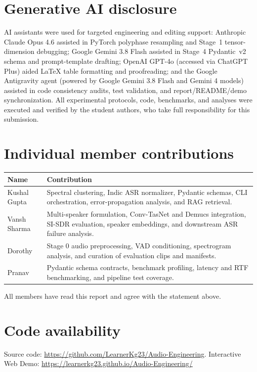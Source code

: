 \documentclass[11pt,a4paper,twocolumn]{article}
\newcommand{\githuburl}{https://github.com/LearnerKg23/Audio-Engineering}
\newcommand{\demourl}{https://learnerkg23.github.io/Audio-Engineering/}
\begin{document}
\section*{Generative AI disclosure}
AI assistants were used for targeted engineering and editing support: Anthropic Claude Opus 4.6 assisted in PyTorch polyphase resampling and Stage~1 tensor-dimension debugging; Google Gemini 3.8 Flash assisted in Stage~4 Pydantic~v2 schema and prompt-template drafting; OpenAI GPT-4o (accessed via ChatGPT Plus) aided LaTeX table formatting and proofreading; and the Google Antigravity agent (powered by Google Gemini 3.8 Flash and Gemini 4 models) assisted in code consistency audits, test validation, and report/README/demo synchronization. All experimental protocols, code, benchmarks, and analyses were executed and verified by the student authors, who take full responsibility for this submission.

\section*{Individual member contributions}
{\small
\begin{tabularx}{\linewidth}{@{}l X@{}}
\toprule
\textbf{Name} & \textbf{Contribution} \\
\midrule
Kushal Gupta & Spectral clustering, Indic ASR normalizer, Pydantic schemas, CLI orchestration, error-propagation analysis, and RAG retrieval. \\
Vansh Sharma & Multi-speaker formulation, Conv-TasNet and Demucs integration, SI-SDR evaluation, speaker embeddings, and downstream ASR failure analysis. \\
Dorothy & Stage 0 audio preprocessing, VAD conditioning, spectrogram analysis, and curation of evaluation clips and manifests. \\
Pranav & Pydantic schema contracts, benchmark profiling, latency and RTF benchmarking, and pipeline test coverage. \\
\bottomrule
\end{tabularx}}

\smallskip
\noindent All members have read this report and agree with the statement above.

\section*{Code availability}
{\raggedright\noindent Source code: \url{\githuburl}. Interactive Web Demo: \url{\demourl}\par}
\end{document}
